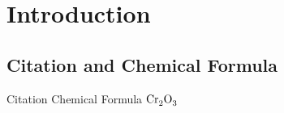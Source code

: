 

%
%
\chapter{Introduction}



\section{Citation and Chemical Formula}
Citation \cite{Rado1964}
Chemical Formula $\chrom$ 	

